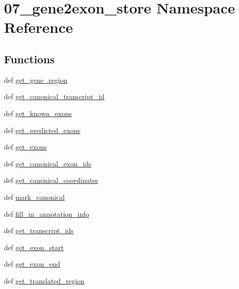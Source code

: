 \hypertarget{namespace07__gene2exon__store}{\section{07\-\_\-gene2exon\-\_\-store Namespace Reference}
\label{namespace07__gene2exon__store}
}
\subsection*{Functions}
\begin{DoxyCompactItemize}
\item 
def \hyperlink{namespace07__gene2exon__store_a899294cccd4a5f8cb90d39e98687b93c}{get\-\_\-gene\-\_\-region}
\item 
def \hyperlink{namespace07__gene2exon__store_aa44edc47526a133e2a0e7a50d88841a5}{get\-\_\-canonical\-\_\-transcript\-\_\-id}
\item 
def \hyperlink{namespace07__gene2exon__store_a98a7b4ed8180b4f91d069bb83380cc23}{get\-\_\-known\-\_\-exons}
\item 
def \hyperlink{namespace07__gene2exon__store_a99a6ca890b946786aaf8b0216b39aa5c}{get\-\_\-predicted\-\_\-exons}
\item 
def \hyperlink{namespace07__gene2exon__store_a115b0249ecb567e8759bd6fb6723ea51}{get\-\_\-exons}
\item 
def \hyperlink{namespace07__gene2exon__store_ac0584be77215ee7c57f189280d1e8a41}{get\-\_\-canonical\-\_\-exon\-\_\-ids}
\item 
def \hyperlink{namespace07__gene2exon__store_a691dc082ef13b268d9ca3e083d80a6b8}{get\-\_\-canonical\-\_\-coordinates}
\item 
def \hyperlink{namespace07__gene2exon__store_a440303ff93c940304d877e4c4991ca0e}{mark\-\_\-canonical}
\item 
def \hyperlink{namespace07__gene2exon__store_a189f146108294b85731410e953e71deb}{fill\-\_\-in\-\_\-annotation\-\_\-info}
\item 
def \hyperlink{namespace07__gene2exon__store_a78a98ce0e0e51f87a70690b171bedf09}{get\-\_\-transcript\-\_\-ids}
\item 
def \hyperlink{namespace07__gene2exon__store_a36f6930bc0331187f347e4001368f239}{get\-\_\-exon\-\_\-start}
\item 
def \hyperlink{namespace07__gene2exon__store_ab8fe3b69cf8f34503d02efcbcc20c8df}{get\-\_\-exon\-\_\-end}
\item 
def \hyperlink{namespace07__gene2exon__store_aa58c70a78b4769f09b923cb200422fe0}{get\-\_\-translated\-\_\-region}

\end{DoxyCompactItemize}
